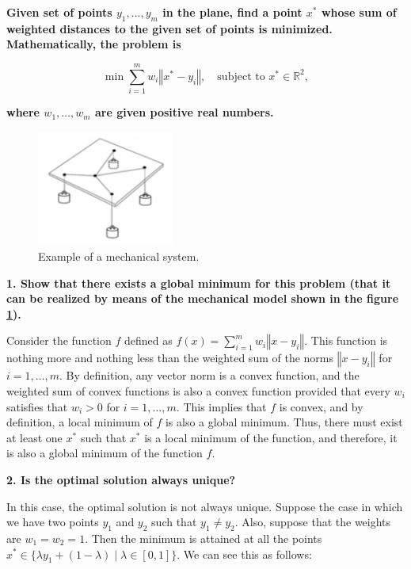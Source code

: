 \documentclass[11pt,a4paper]{article}
\begin{document}
\setlength{\parskip}{1em}

\noindent \textbf{Given set of points $y_1, \dots, y_m$ in the plane, find a point $x^*$ whose sum of
weighted distances to the given set of points is minimized. Mathematically, the problem is}

\[
  \min \sum_{i=1}^m w_i \left\Vert x^* - y_i \right\Vert, \quad \text{subject to } x^* \in \mathbb{R}^2,
\]

\noindent \textbf{where $w_1, \dots, w_m$ are given positive real numbers.}

\begin{figure}[H]
  \centering
  \includegraphics[width=0.4\textwidth]{img/mechanical_system}
  \caption{Example of a mechanical system.}
  \label{fig:mechanical_system}
\end{figure}

\noindent \textbf{1. Show that there exists a global minimum for this problem (that it can be
realized by means of the mechanical model shown in the figure \ref{fig:mechanical_system}).}

Consider the function $f$ defined as $f(x) = \sum_{i=1}^m w_i \left\Vert x - y_i \right\Vert$.
This function is nothing more and nothing less than the weighted sum of the norms
$\left\Vert x - y_i \right\Vert$ for $i = 1, \dots, m$. By definition, any vector norm is
a convex function, and the weighted sum of convex functions is also a convex function provided that
every $w_i$ satisfies that $w_i > 0$ for $i = 1, \dots, m$. This implies that $f$ is convex,
and by definition, a local minimum of $f$ is also a global minimum. Thus, there must exist at least
one $x^*$ such that $x^*$ is a local minimum of the function, and therefore, it is also a global minimum
of the function $f$.

\noindent \textbf{2. Is the optimal solution always unique?}

In this case, the optimal solution is not always unique. Suppose the case in which we have two points
$y_1$ and $y_2$ such that $y_1 \neq y_2$. Also, suppose that the weights are $w_1 = w_2 = 1$. Then
the minimum is attained at all the points
$x^* \in \lbrace \lambda y_1 + (1 - \lambda) \; | \; \lambda \in [0, 1] \rbrace$.
We can see this as follows:
\end{document}
